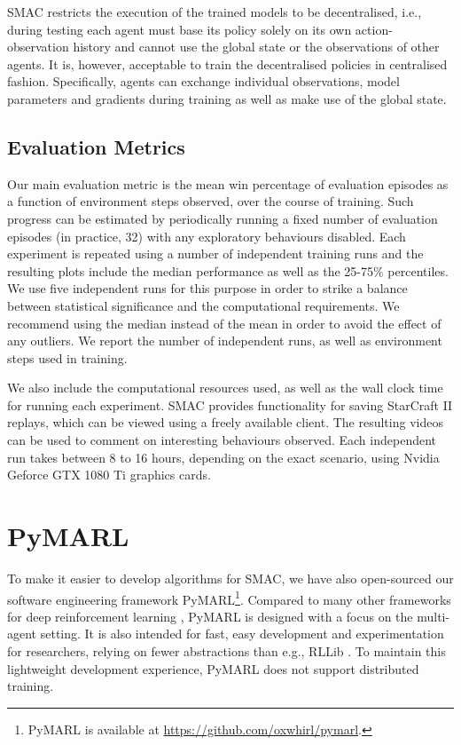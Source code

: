 \documentclass[twoside,11pt]{article}
\renewcommand{\cite}{\citep}
\begin{document}
SMAC restricts the execution of the trained models to be decentralised, i.e., during testing each agent must base its policy solely on its own action-observation history and cannot use the global state or the observations of other agents. It is, however, acceptable to train the decentralised policies in centralised fashion. Specifically, agents can exchange individual observations, model parameters and gradients during training as well as make use of the global state. 

\subsection{Evaluation Metrics}


Our main evaluation metric is the mean win percentage of evaluation episodes as a function of environment steps observed, over the course of training. 
Such progress can be estimated by periodically running a fixed number of evaluation episodes (in practice, 32) with any exploratory behaviours disabled. 
Each experiment is repeated using a number of independent training runs and the resulting plots include the median performance as well as the 25-75\% percentiles. 
We use five independent runs for this purpose in order to strike a balance between statistical significance and the computational requirements.
We recommend using the median instead of the mean in order to avoid the effect of any outliers. 
We report the number of independent runs, as well as environment steps used in training. 



We also include the computational resources used, as well as the wall clock time for running each experiment. SMAC provides functionality for saving StarCraft II replays, which can be viewed using a freely available client. The resulting videos can be used to comment on interesting behaviours observed. Each independent run takes between 8 to 16 hours, depending on the exact scenario, using Nvidia Geforce GTX 1080 Ti graphics cards.
 \section{PyMARL}
\label{sec:pymarl}

To make it easier to develop algorithms for SMAC, we have also open-sourced our 
software engineering framework PyMARL\footnote{PyMARL is available at 
\url{https://github.com/oxwhirl/pymarl}.}.
Compared to many other frameworks for deep reinforcement learning  
\citep{stooke2019rlpyt,stable-baselines,hoffman2020acme}, PyMARL is designed 
with a focus on the multi-agent setting.
It is also intended for fast, easy development and experimentation for 
researchers, relying on fewer abstractions than e.g., RLLib 
\cite{liang2018rllib}.
To maintain this lightweight development experience, PyMARL does not support 
distributed training.
\end{document}
